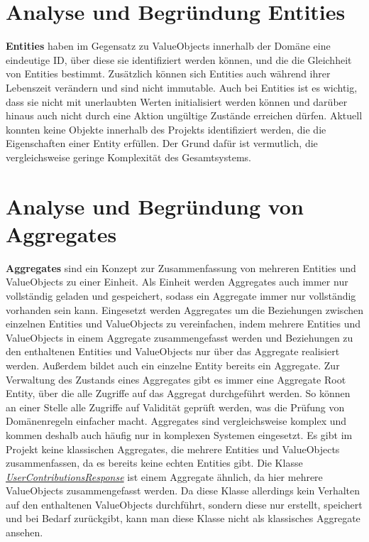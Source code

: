 \documentclass[12pt]{article}
\begin{document}
\newpage

\section{Analyse und Begründung Entities}

\textbf{Entities} haben im Gegensatz zu ValueObjects innerhalb der Domäne eine eindeutige ID, über diese sie identifiziert werden können, und die die Gleichheit von Entities bestimmt. Zusätzlich können sich Entities auch während ihrer Lebenszeit verändern und sind nicht immutable.
Auch bei Entities ist es wichtig, dass sie nicht mit unerlaubten Werten initialisiert werden können und darüber hinaus auch nicht durch eine Aktion ungültige Zustände erreichen dürfen.
\newline
Aktuell konnten keine Objekte innerhalb des Projekts identifiziert werden, die die Eigenschaften einer Entity erfüllen.
Der Grund dafür ist vermutlich, die vergleichsweise geringe Komplexität des Gesamtsystems.

\newpage

\section{Analyse und Begründung von Aggregates}

\textbf{Aggregates} sind ein Konzept zur Zusammenfassung von mehreren Entities und ValueObjects zu einer Einheit. 
Als Einheit werden Aggregates auch immer nur vollständig geladen und gespeichert, sodass ein Aggregate immer nur vollständig vorhanden sein kann.
Eingesetzt werden Aggregates um die Beziehungen zwischen einzelnen Entities und ValueObjects zu vereinfachen, indem mehrere Entities und ValueObjects in einem Aggregate zusammengefasst werden und Beziehungen zu den enthaltenen Entities und ValueObjects nur über das Aggregate realisiert werden. 
Außerdem bildet auch ein einzelne Entity bereits ein Aggregate.
Zur Verwaltung des Zustands eines Aggregates gibt es immer eine Aggregate Root Entity, über die alle Zugriffe auf das Aggregat durchgeführt werden.
So können an einer Stelle alle Zugriffe auf Validität geprüft werden, was die Prüfung von Domänenregeln einfacher macht.
\newline
Aggregates sind vergleichsweise komplex und kommen deshalb auch häufig nur in komplexen Systemen eingesetzt.
Es gibt im Projekt keine klassischen Aggregates, die mehrere Entities und ValueObjects zusammenfassen, da es bereits keine echten Entities gibt.
Die Klasse \textit{\href{https://github.com/lukaspanni/OpenSourceStats/blob/main/app/src/main/java/de/lukaspanni/opensourcestats/data/UserContributionsResponse.java}{UserContributionsResponse}} ist einem Aggregate ähnlich, da hier mehrere ValueObjects zusammengefasst werden. 
Da diese Klasse allerdings kein Verhalten auf den enthaltenen ValueObjects durchführt, sondern diese nur erstellt, speichert und bei Bedarf zurückgibt, kann man diese Klasse nicht als klassisches Aggregate ansehen.
\end{document}
